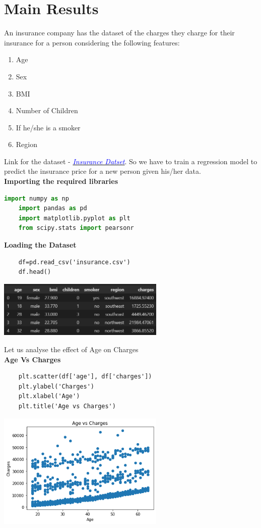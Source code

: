 \documentclass[12pt]{article}
\numberwithin{equation}{section}
\begin{document}
{\section{Main Results}
An insurance company has the dataset of the charges they charge for their insurance for a person considering the following features:
\begin{enumerate}
	\item Age 
	\item Sex
	\item BMI
	\item Number of Children
	\item If he/she is a smoker
	\item Region
\end{enumerate}
Link for the dataset - \href{https://www.kaggle.com/mirichoi0218/insurance}{\textit{\textcolor{blue}{Insurance Datset}}}. So we have to train a regression model to predict the insurance price for a new person given his/her data.\\
\textbf{\large{Importing the required libraries}}
\begin{lstlisting}[language=Python]
	import numpy as np
	import pandas as pd
	import matplotlib.pyplot as plt
	from scipy.stats import pearsonr
\end{lstlisting}
\textbf{\large{Loading the Dataset}}
\begin{lstlisting}
	df=pd.read_csv('insurance.csv')
	df.head()
\end{lstlisting}
\begin{center}
\includegraphics[width=8cm]{work1}
\end{center}
Let us analyse the effect of Age on Charges\\
\textbf{\large{Age Vs Charges}}
\begin{lstlisting}
	plt.scatter(df['age'], df['charges'])
	plt.ylabel('Charges')
	plt.xlabel('Age')
	plt.title('Age vs Charges')
\end{lstlisting}
\begin{center}
\includegraphics[width=8cm]{work2}

\end{center}}
\end{document}

